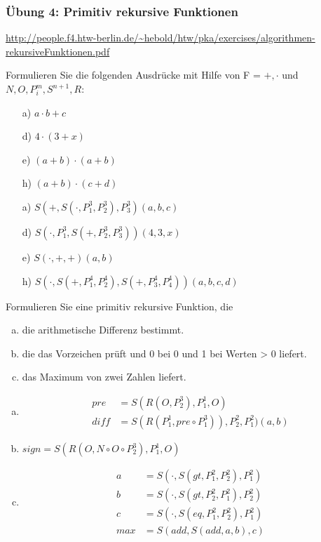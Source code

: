 \begin{card}
	\frametitle{Übung 4: Primitiv rekursive Funktionen}
	\url{http://people.f4.htw-berlin.de/~hebold/htw/pka/exercises/algorithmen-rekursiveFunktionen.pdf}
\end{card}

\begin{card}
  Formulieren Sie die folgenden Ausdrücke mit Hilfe von F = ${+, \cdot}$ und ${N, O, P^m_i, S^{n+1}, R}$:
	\begin{enumerate}
    \item[a)] $a \cdot b + c$
    \item[d)] $4 \cdot (3 + x)$
    \item[e)] $(a + b) \cdot (a + b)$
    \item[h)] $(a + b) \cdot (c + d)$
	\end{enumerate}
	\hr
	\begin{enumerate}
    \item[a)] $S(+, S(\cdot, P^3_1, P^3_2), P^3_3)(a, b, c)$
    \item[d)] $S(\cdot, P^3_1, S(+, P^3_2, P^3_3))(4, 3, x)$
    \item[e)] $S(\cdot, +, +)(a, b)$
    \item[h)] $S(\cdot, S(+, P^4_1, P^4_2), S(+, P^4_3, P^4_4))(a, b, c, d)$
	\end{enumerate}
\end{card}

\begin{card}
  Formulieren Sie eine primitiv rekursive Funktion, die
  \begin{enumerate}[a)]
    \item die arithmetische Differenz bestimmt.
    \item die das Vorzeichen prüft und 0 bei 0 und 1 bei Werten > 0 liefert.
    \item das Maximum von zwei Zahlen liefert.
	\end{enumerate}
	\hr
  \begin{enumerate}[a)]
    \item
      \begin{align*}
        pre &= S(R(O, P^3_2), P^1_1, O) \\
        diff &= S(R(P^1_1, pre \circ P^3_1)), P^2_2, P^2_1)(a, b)
      \end{align*}
    \item $sign = S(R(O, N \circ O \circ P^3_2), P^1_1, O)$
    \item
      \begin{align*}
        a &= S(\cdot, S(gt, P^2_1, P^2_2), P^2_1) \\
        b &= S(\cdot, S(gt, P^2_2, P^2_1), P^2_2) \\
        c &= S(\cdot, S(eq, P^2_1, P^2_2), P^2_1) \\
        max &= S(add, S(add, a, b), c)
      \end{align*}
	\end{enumerate}
\end{card}


